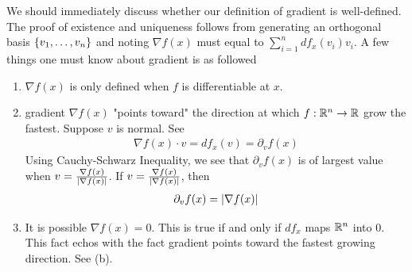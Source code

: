 \documentclass{report}
\begin{document}
\begin{mdframed}
We should immediately discuss whether our definition of gradient is well-defined. The proof of existence and uniqueness follows from generating an orthogonal basis $\{ v_1,\dots ,v_n \}$ and noting $\nabla f(x)$ must equal to $\sum_{i=1}^n df_x(v_i)v_i$. A few things one must know about gradient is as followed
\begin{enumerate}[label=(\alph*)]
  \item $\nabla f(x)$ is only defined when $f$ is differentiable at  $x$.
  \item gradient $\nabla f(x)$ "points toward" the direction at which $f:\mathbb{R}^n\rightarrow \mathbb{R}$ grow the fastest. Suppose $v$ is normal. See 
\begin{align*}
\nabla f(x)\cdot v = df_x(v)=\partial_v f(x)
\end{align*}
Using Cauchy-Schwarz Inequality, we see that $\partial_v f(x)$ is of largest value when $v=\frac{\nabla f(x)}{\left|\nabla f(x)\right|}$. If $v=\frac{\nabla f(x)}{\left|\nabla f(x)\right|}$, then 
\begin{align*}
\partial_v f(x)=\left|\nabla f(x)\right|
\end{align*}
\item It is possible $\nabla f(x)=0$. This is true if and only if $df_x$ maps  $\mathbb{R}^n$ into $0$. This fact echos with the fact gradient points toward the fastest growing direction. See (b).  
\end{enumerate}
\end{mdframed}
\end{document}

